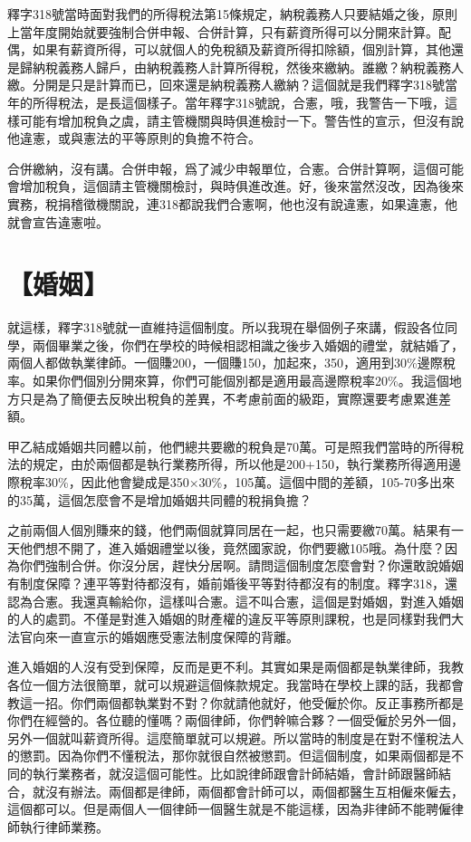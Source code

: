 \documentclass[]{ctexbook}
\begin{document}
釋字318號當時面對我們的所得稅法第15條規定，納稅義務人只要結婚之後，原則上當年度開始就要強制合併申報、合併計算，只有薪資所得可以分開來計算。配偶，如果有薪資所得，可以就個人的免稅額及薪資所得扣除額，個別計算，其他還是歸納稅義務人歸戶，由納稅義務人計算所得稅，然後來繳納。誰繳？納稅義務人繳。分開是只是計算而已，回來還是納稅義務人繳納？這個就是我們釋字318號當年的所得稅法，是長這個樣子。當年釋字318號說，合憲，哦，我警告一下哦，這樣可能有增加稅負之虞，請主管機關與時俱進檢討一下。警告性的宣示，但沒有說他違憲，或與憲法的平等原則的負擔不符合。

合併繳納，沒有講。合併申報，爲了減少申報單位，合憲。合併計算啊，這個可能會增加稅負，這個請主管機關檢討，與時俱進改進。好，後來當然沒改，因為後來實務，稅捐稽徵機關說，連318都說我們合憲啊，他也沒有說違憲，如果違憲，他就會宣告違憲啦。

\hypertarget{ux5a5aux59fb}{%
\section{【婚姻】}\label{ux5a5aux59fb}}

就這樣，釋字318號就一直維持這個制度。所以我現在舉個例子來講，假設各位同學，兩個畢業之後，你們在學校的時候相認相識之後步入婚姻的禮堂，就結婚了，兩個人都做執業律師。一個賺200，一個賺150，加起來，350，適用到30\%邊際稅率。如果你們個別分開來算，你們可能個別都是適用最高邊際稅率20\%。我這個地方只是為了簡便去反映出稅負的差異，不考慮前面的級距，實際還要考慮累進差額。

甲乙結成婚姻共同體以前，他們總共要繳的稅負是70萬。可是照我們當時的所得稅法的規定，由於兩個都是執行業務所得，所以他是200+150，執行業務所得適用邊際稅率30\%，因此他會變成是350×30\%，105萬。這個中間的差額，105-70多出來的35萬，這個怎麼會不是增加婚姻共同體的稅捐負擔？

之前兩個人個別賺來的錢，他們兩個就算同居在一起，也只需要繳70萬。結果有一天他們想不開了，進入婚姻禮堂以後，竟然國家說，你們要繳105哦。為什麼？因為你們強制合併。你沒分居，趕快分居啊。請問這個制度怎麼會對？你還敢說婚姻有制度保障？連平等對待都沒有，婚前婚後平等對待都沒有的制度。釋字318，還認為合憲。我還真輸給你，這樣叫合憲。這不叫合憲，這個是對婚姻，對進入婚姻的人的處罰。不僅是對進入婚姻的財產權的違反平等原則課稅，也是同樣對我們大法官向來一直宣示的婚姻應受憲法制度保障的背離。

進入婚姻的人沒有受到保障，反而是更不利。其實如果是兩個都是執業律師，我教各位一個方法很簡單，就可以規避這個條款規定。我當時在學校上課的話，我都會教這一招。你們兩個都執業對不對？你就請他就好，他受僱於你。反正事務所都是你們在經營的。各位聽的懂嗎？兩個律師，你們幹嘛合夥？一個受僱於另外一個，另外一個就叫薪資所得。這麼簡單就可以規避。所以當時的制度是在對不懂稅法人的懲罰。因為你們不懂稅法，那你就很自然被懲罰。但這個制度，如果兩個都是不同的執行業務者，就沒這個可能性。比如說律師跟會計師結婚，會計師跟醫師結合，就沒有辦法。兩個都是律師，兩個都會計師可以，兩個都醫生互相僱來僱去，這個都可以。但是兩個人一個律師一個醫生就是不能這樣，因為非律師不能聘僱律師執行律師業務。
\end{document}
